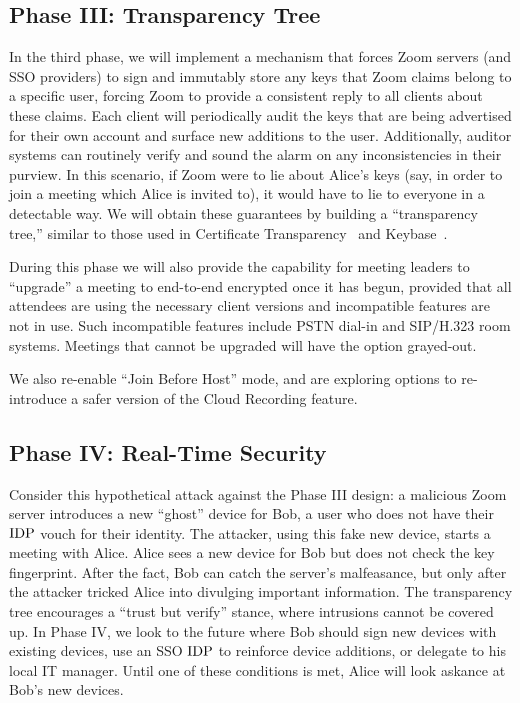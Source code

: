 \subsection{Phase III: Transparency Tree}
In the third phase, we will implement a mechanism that forces Zoom servers (and SSO providers) to sign and immutably store any keys that Zoom claims belong to a specific user, forcing Zoom to provide a consistent reply to all clients about these claims. Each client will periodically audit the keys that are being advertised for their own account and surface new additions to the user. Additionally, auditor systems can routinely verify and sound the alarm on any inconsistencies in their purview. In this scenario, if Zoom were to lie about Alice's keys (say, in order to join a meeting which Alice is invited to), it would have to lie to everyone in a detectable way. We will obtain these guarantees by building a ``transparency tree,'' similar to those used in Certificate Transparency~\cite{langley2013certificate} and Keybase~\cite{keybase}.

During this phase we will also provide the capability for meeting leaders to ``upgrade'' a meeting
to end-to-end encrypted once it has begun, provided that all attendees are using the necessary
client versions and incompatible features are not in use. Such incompatible features include PSTN
dial-in and SIP/H.323 room systems. Meetings that cannot be upgraded will have the option grayed-out.

We also re-enable ``Join Before Host'' mode, and are exploring options to re-introduce a safer version of the Cloud Recording feature.
\subsection{Phase IV: Real-Time Security}
Consider this hypothetical attack against the Phase III design: a malicious Zoom server introduces a new ``ghost'' device for Bob, a user who does not have their $\mathrm{IDP}$ vouch for their identity. The attacker, using this fake new device, starts a meeting with Alice. Alice sees a new device for Bob but does not check the key fingerprint. After the fact, Bob can catch the server's malfeasance, but only after the attacker tricked Alice into divulging important information. The transparency tree encourages a ``trust but verify'' stance, where intrusions cannot be covered up. In Phase IV, we look to the future where Bob should sign new devices with existing devices, use an SSO $\mathrm{IDP}$ to reinforce device additions, or delegate to his local IT manager. Until one of these conditions is met, Alice will look askance at Bob's new devices.
